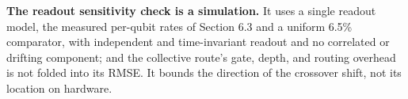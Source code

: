 %
%

\textbf{The readout sensitivity check is a simulation.} It uses a single
readout model, the measured per-qubit rates of Section 6.3 and a uniform
6.5\% comparator, with independent and time-invariant readout and no
correlated or drifting component; and the collective route's gate, depth,
and routing overhead is not folded into its RMSE. It bounds the direction
of the crossover shift, not its location on hardware.
